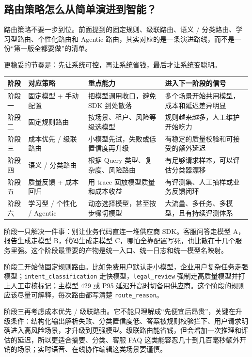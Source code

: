 \documentclass[10pt,a4paper]{ctexart}
\begin{document}
\subsection{路由策略怎么从简单演进到智能？}


路由策略不要一步到位。前面提到的固定规则、级联路由、语义 / 分类路由、学习型路由、个性化路由和 Agentic 路由，其实对应的是一条演进路线，而不是一份“第一版全都要做”的清单。



更稳妥的节奏是：先让系统可控，再让系统省钱，最后才让系统变聪明。


{\footnotesize
\begin{tabularx}{\textwidth}{|X|X|X|X|}
\hline
\textbf{阶段} & \textbf{对应策略} & \textbf{重点能力} & \textbf{进入下一阶段的信号} \\
\hline
阶段一 & 固定模型 + 手动配置 & 把模型调用收口，避免 SDK 到处散落 & 多个场景开始共用模型，成本和延迟差异明显 \\
\hline
阶段二 & 固定规则路由 & 按场景、租户、风险等级选模型 & 规则越来越多，人工维护开始吃力 \\
\hline
阶段三 & 成本优先 / 级联路由 & 小模型先试，失败或低置信度再升级 & 有稳定的质量校验和可接受的额外延迟 \\
\hline
阶段四 & 语义 / 分类路由 & 根据 Query 类型、复杂度、风险路由 & 有足够请求样本，可以评估分类器漂移 \\
\hline
阶段五 & 质量反馈 + 成本回归 & 用 trace 回放模型质量和成本收益 & 有评测集、人工抽样或业务反馈闭环 \\
\hline
阶段六 & 学习型 / 个性化 / Agentic & 动态选择模型，甚至按步骤切模型 & 大流量、多任务、多模型，且有持续评测体系 \\
\hline
\end{tabularx}
}



阶段一只解决一件事：别让业务代码直连一堆供应商 SDK。客服问答走模型 A，报告生成走模型 B，代码生成走模型 C，哪怕全靠配置写死，也比散在十几个服务里强。这个阶段最重要的产物是统一入口、统一日志和统一模型名映射。



阶段二开始做固定规则路由。比如免费用户默认走小模型，企业用户复杂任务走强模型；\texttt{intent\_classification} 走快模型，\texttt{legal\_review} 强制走高质量模型并打上人工审核标记；主模型 429 或 P95 延迟升高时切备用供应商。这个阶段的规则应该尽量可解释，每次路由都写清楚 \texttt{route\_reason}。



阶段三再考虑成本优先 / 级联路由。它不能只理解成“先便宜后昂贵”，关键在升级条件：结构化输出解析失败、分类置信度低、答案被规则校验拦下、用户请求明确进入高风险场景，才升级到更强模型。级联路由能省钱，但会增加一次推理和评估的延迟，所以更适合摘要、分类、客服 FAQ 这类能容忍几十到几百毫秒额外开销的场景；实时语音、在线协作编辑这类场景要谨慎。
\end{document}
